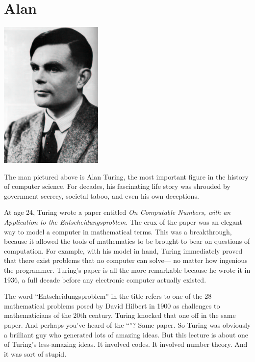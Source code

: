 \begin{problems}
\classproblems
{}
\end{problems}

\section{Alan }\label{Turing_sec}

\centerline{\includegraphics[width=2in]{figures/turing.pdf}}

The man pictured above is Alan Turing, the most important figure in
the history of computer science.  For decades, his fascinating life
story was shrouded by government secrecy, societal taboo, and even his
own deceptions.

At age 24, Turing wrote a paper entitled \emph{On Computable Numbers,
with an Application to the Entscheidungsproblem}.  The crux of the
paper was an elegant way to model a computer in mathematical terms.
This was a breakthrough, because it allowed the tools of mathematics
to be brought to bear on questions of computation.  For example, with
his model in hand, Turing immediately proved that there exist problems
that no computer can solve--- no matter how ingenious the programmer.
Turing's paper is all the more remarkable because he wrote it in 1936,
a full decade before any electronic computer actually existed.

The word ``Entscheidungsproblem'' in the title refers to one of the 28
mathematical problems posed by David Hilbert in 1900 as challenges to
mathematicians of the 20th century.  Turing knocked that one off in the
same paper.  And perhaps you've heard of the ``''?  Same paper.  So Turing was obviously a brilliant guy who
generated lots of amazing ideas.  But this lecture is about one of
Turing's less-amazing ideas.  It involved codes.  It involved number
theory.  And it was sort of stupid.

